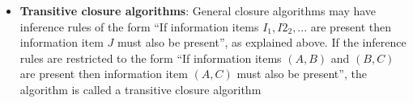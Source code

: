 \documentclass{report}
\begin{document}
\begin{itemize}
            \bigbreak \noindent 
            The second is that the closure algorithm as introduced above is not really an algorithm in that it does not specify when and how to apply the inference rules and when to stop; it is rather a declarative,
        \item \textbf{Transitive closure algorithms}: General closure algorithms may have inference rules of the form “If information items $I_{1},I2_{2},...$ are present then information item $J$ must also be present”, as explained above. If the inference rules are restricted to the form “If information items $(A,B)$ and $(B,C)$ are present then information item $(A,C)$ must also be present”, the algorithm is called a transitive closure algorithm





    \end{itemize}
\end{document}
